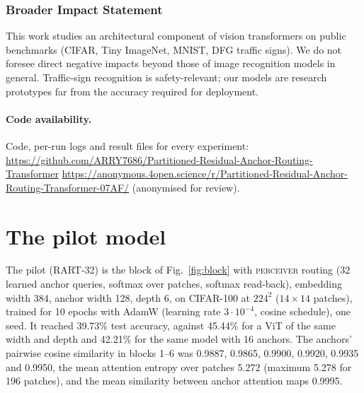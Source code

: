 \documentclass[10pt]{article}
\makeatletter
\newcommand{\codelink}{\if@accepted
  \url{https://github.com/ARRY7686/Partitioned-Residual-Anchor-Routing-Transformer}\else
  \url{https://anonymous.4open.science/r/Partitioned-Residual-Anchor-Routing-Transformer-07AF/} (anonymised for review)\fi}
\makeatother
\begin{document}
\subsubsection*{Broader Impact Statement}
This work studies an architectural component of vision transformers on public benchmarks
(CIFAR, Tiny ImageNet, MNIST, DFG traffic signs). We do not foresee direct negative impacts
beyond those of image recognition models in general. Traffic-sign recognition is safety-relevant;
our models are research prototypes far from the accuracy required for deployment.

\paragraph{Code availability.} Code, per-run logs and result files for every experiment:
\codelink.




\appendix

\section{The pilot model}
\label{app:pilot}
The pilot (RART-32) is the block of Fig.~\ref{fig:block} with \textsc{perceiver} routing (32
learned anchor queries, softmax over patches, softmax read-back), embedding width 384, anchor width
128, depth 6, on CIFAR-100 at $224^2$ ($14\times14$ patches), trained for 10 epochs with AdamW
(learning rate $3\cdot10^{-4}$, cosine schedule), one seed. It reached 39.73\% test accuracy,
against 45.44\% for a ViT of the same width and depth and 42.21\% for the same model with 16
anchors. The anchors' pairwise cosine similarity in blocks 1--6 was 0.9887, 0.9865, 0.9900,
0.9920, 0.9935 and 0.9950, the mean attention entropy over patches 5.272 (maximum 5.278 for 196
patches), and the mean similarity between anchor attention maps 0.9995.
\end{document}
